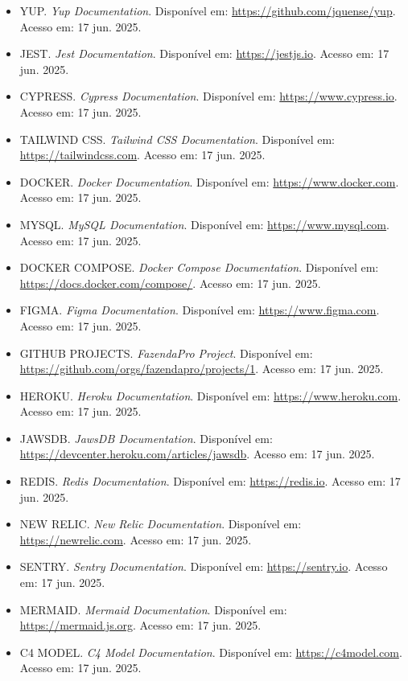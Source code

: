 \documentclass[12pt, a4paper]{article}
\begin{document}
\begin{spacing}{1.5}
\begin{itemize}
    \item YUP. \textit{Yup Documentation}. Disponível em: \url{https://github.com/jquense/yup}. Acesso em: 17 jun. 2025.
    \item JEST. \textit{Jest Documentation}. Disponível em: \url{https://jestjs.io}. Acesso em: 17 jun. 2025.
    \item CYPRESS. \textit{Cypress Documentation}. Disponível em: \url{https://www.cypress.io}. Acesso em: 17 jun. 2025.
    \item TAILWIND CSS. \textit{Tailwind CSS Documentation}. Disponível em: \url{https://tailwindcss.com}. Acesso em: 17 jun. 2025.
    \item DOCKER. \textit{Docker Documentation}. Disponível em: \url{https://www.docker.com}. Acesso em: 17 jun. 2025.
    \item MYSQL. \textit{MySQL Documentation}. Disponível em: \url{https://www.mysql.com}. Acesso em: 17 jun. 2025.
    \item DOCKER COMPOSE. \textit{Docker Compose Documentation}. Disponível em: \url{https://docs.docker.com/compose/}. Acesso em: 17 jun. 2025.
    \item FIGMA. \textit{Figma Documentation}. Disponível em: \url{https://www.figma.com}. Acesso em: 17 jun. 2025.
    \item GITHUB PROJECTS. \textit{FazendaPro Project}. Disponível em: \url{https://github.com/orgs/fazendapro/projects/1}. Acesso em: 17 jun. 2025.
    \item HEROKU. \textit{Heroku Documentation}. Disponível em: \url{https://www.heroku.com}. Acesso em: 17 jun. 2025.
    \item JAWSDB. \textit{JawsDB Documentation}. Disponível em: \url{https://devcenter.heroku.com/articles/jawsdb}. Acesso em: 17 jun. 2025.
    \item REDIS. \textit{Redis Documentation}. Disponível em: \url{https://redis.io}. Acesso em: 17 jun. 2025.
    \item NEW RELIC. \textit{New Relic Documentation}. Disponível em: \url{https://newrelic.com}. Acesso em: 17 jun. 2025.
    \item SENTRY. \textit{Sentry Documentation}. Disponível em: \url{https://sentry.io}. Acesso em: 17 jun. 2025.
    \item MERMAID. \textit{Mermaid Documentation}. Disponível em: \url{https://mermaid.js.org}. Acesso em: 17 jun. 2025.
    \item C4 MODEL. \textit{C4 Model Documentation}. Disponível em: \url{https://c4model.com}. Acesso em: 17 jun. 2025.
\end{itemize}
\end{spacing}
\end{document}
